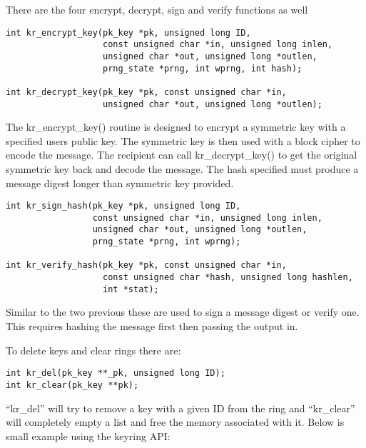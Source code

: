 \documentclass{book}
\begin{document}
There are the four encrypt, decrypt, sign and verify functions as well
\begin{verbatim}
int kr_encrypt_key(pk_key *pk, unsigned long ID, 
                   const unsigned char *in, unsigned long inlen,
                   unsigned char *out, unsigned long *outlen,
                   prng_state *prng, int wprng, int hash);

int kr_decrypt_key(pk_key *pk, const unsigned char *in,
                   unsigned char *out, unsigned long *outlen);
\end{verbatim}

The kr\_encrypt\_key() routine is designed to encrypt a symmetric key with a specified users public key.  The symmetric
key is then used with a block cipher to encode the message.  The recipient can call kr\_decrypt\_key() to get the original
symmetric key back and decode the message.  The hash specified must produce a message digest longer than symmetric key 
provided.  

\begin{verbatim}
int kr_sign_hash(pk_key *pk, unsigned long ID, 
                 const unsigned char *in, unsigned long inlen,
                 unsigned char *out, unsigned long *outlen,
                 prng_state *prng, int wprng);

int kr_verify_hash(pk_key *pk, const unsigned char *in, 
                   const unsigned char *hash, unsigned long hashlen,
                   int *stat);
\end{verbatim}

Similar to the two previous these are used to sign a message digest or verify one.  This requires hashing the message
first then passing the output in. 

To delete keys and clear rings there are:
\begin{verbatim}
int kr_del(pk_key **_pk, unsigned long ID);
int kr_clear(pk_key **pk);
\end{verbatim}
``kr\_del'' will try to remove a key with a given ID from the ring and ``kr\_clear'' will completely empty a list and free
the memory associated with it.  Below is small example using the keyring API:
\end{document}
